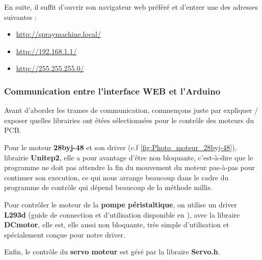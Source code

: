 En suite, il suffit d'ouvrir son navigateur web préféré et d'entrer une des adresses suivantes :
\begin{itemize}
    \item \url{http://spraymachine.local/}
    \item \url{http://192.168.1.1/}
    \item \url{http://255.255.255.0/}
\end{itemize}

\subsubsection{Communication entre l'interface WEB et l'Arduino}
Avant d'aborder les trames de communication, commençons juste par expliquer / exposer quelles librairies ont étées sélectionnées
pour le contrôle des moteurs du PCB.

Pour le moteur \textbf{28byj-48} et son driver (c.f \autoref{fig:Photo_moteur_28byj-48}), librairie \textbf{Unitep2}\cite{Unistep2}\footnotemark {},
elle a pour avantage d'être non bloquante, c'est-à-dire que le programme ne doit pas attendre la fin du mouvement du moteur pas-à-pas pour continuer son execution, ce qui nous arrange beaucoup dans le cadre du programme
de contrôle qui dépend beaucoup de la méthode millis.

Pour contrôler le moteur de la \textbf{pompe péristaltique}, on utilise un driver \textbf{L293d} (guide de connection et d'utilisation disponible en \autocite{L293D_tuto}\footnotemark{}),
avec la libraire \textbf{DCmotor}\cite{DCmotor}\footnotemark{}, elle est, elle aussi non bloquante, très simple d'utilisation et spécialement conçue pour notre driver.

Enfin, le contrôle du \textbf{servo moteur} est géré par la libraire \textbf{Servo.h}\cite{Servo}\footnotemark{}.

